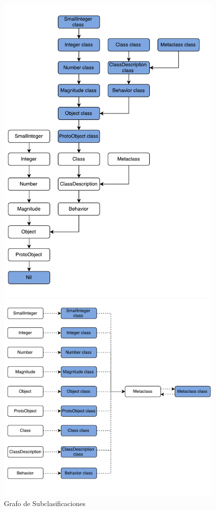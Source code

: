 \documentclass[a4paper, 11pt]{article}
\begin{document}
\begin{figure}[H]
\centering
\begin{minipage}{.5\textwidth}
  \centering
  \includegraphics[width=\linewidth]{images/metamodelo_superclases.pdf}
  \caption{Grafo de Subclasificaciones}
  \label{fig:sub1}
\end{minipage}%
\begin{minipage}{.5\textwidth}
  \centering
  \includegraphics[width=1.2\linewidth]{images/metamodelo_instancia_de.pdf}

\end{minipage}
\end{figure}
\end{document}
